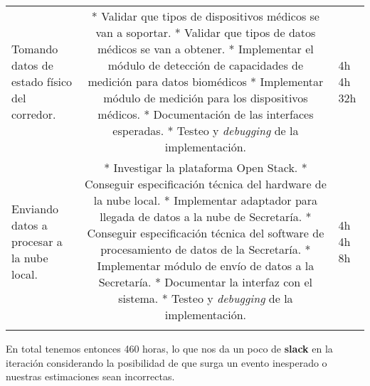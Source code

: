 \begin{longtable}[c]{@{}lcl@{}}
\begin{minipage}[t]{0.28\columnwidth}
Tomando datos de estado físico del corredor.
\end{minipage} & \begin{minipage}[t]{0.62\columnwidth}\centering
* Validar que tipos de dispositivos médicos se van a soportar. * Validar
que tipos de datos médicos se van a obtener. * Implementar el módulo de
detección de capacidades de medición para datos biomédicos * Implementar
módulo de medición para los dispositivos médicos. * Documentación de las
interfaces esperadas. * Testeo y \emph{debugging} de la implementación.
\end{minipage} & \begin{minipage}[t]{0.10\columnwidth}\raggedright
4h 4h 32h
\end{minipage}
\\\noalign{\medskip}
\begin{minipage}[t]{0.28\columnwidth}\raggedright
Enviando datos a procesar a la nube local.
\end{minipage} & \begin{minipage}[t]{0.62\columnwidth}\centering
* Investigar la plataforma Open Stack. * Conseguir especificación
técnica del hardware de la nube local. * Implementar adaptador para
llegada de datos a la nube de Secretaría. * Conseguir especificación
técnica del software de procesamiento de datos de la Secretaría. *
Implementar módulo de envío de datos a la Secretaría. * Documentar la
interfaz con el sistema. * Testeo y \emph{debugging} de la
implementación.
\end{minipage} & \begin{minipage}[t]{0.10\columnwidth}\raggedright
4h 4h 8h
\end{minipage}
\\\noalign{\medskip}
\hline
\end{longtable}

En total tenemos entonces 460 horas, lo que nos da un poco de
\textbf{slack} en la iteración considerando la posibilidad de que surga
un evento inesperado o nuestras estimaciones sean incorrectas.
